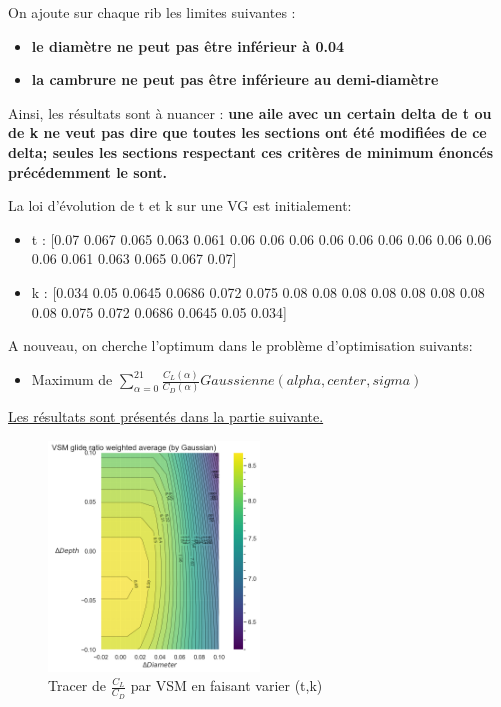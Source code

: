 \documentclass[conference]{IEEEtran}
\begin{document}
    On ajoute sur chaque rib les limites suivantes :
    \begin{itemize}
        \item \textbf{le diamètre ne peut pas être inférieur à 0.04}
        \item \textbf{la cambrure ne peut pas être inférieure au demi-diamètre}
    \end{itemize}

    Ainsi, les résultats sont à nuancer : \textbf{une aile avec un certain delta de t ou de k ne veut pas dire que toutes les sections ont été modifiées de ce delta; seules les sections respectant ces critères de minimum énoncés précédemment le sont.}

La loi d'évolution de t et k sur une VG est initialement:  
\begin{itemize}
    \item t : [0.07 0.067 0.065 0.063 0.061 0.06 0.06  0.06 0.06 0.06  0.06  0.06 0.06 0.06  0.06 0.061 0.063 0.065 0.067 0.07]
    \item k : [0.034 0.05 0.0645 0.0686 0.072 0.075 0.08 0.08 0.08 0.08      0.08 0.08 0.08 0.08 0.075 0.072 0.0686 0.0645 0.05 0.034]
\end{itemize}

    A nouveau, on cherche l'optimum dans le problème d'optimisation suivants:
    \begin{itemize}
        \item Maximum de $\sum_{\alpha = 0}^{21}\frac{C_L(\alpha)}{C_D(\alpha)} Gaussienne(alpha, center, sigma) $
    \end{itemize}
    \underline{Les résultats sont présentés dans la partie suivante.}

\begin{figure}[H]
    \centering
    \includegraphics[width=0.5\textwidth]{Pics/vsm.png}  
    \caption{Tracer de $\frac{C_L}{C_D}$ par VSM en faisant varier (t,k)}
    \label{fig:vsm}
\end{figure}
\end{document}
